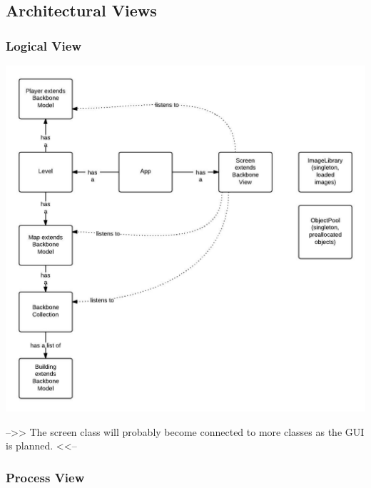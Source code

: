 \subsection{Architectural Views}

\subsubsection{Logical View} %
\includegraphics[width=\textwidth]{pictures/class_diagram}

-->> The screen class will probably become connected to more classes as the GUI is planned. <<--

\subsubsection{Process View} %

